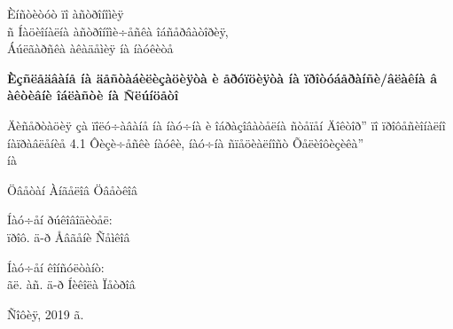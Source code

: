 \begin{titlepage}
    \begin{center}
    
    \large  Èíñòèòóò ïî àñòðîíîìèÿ \\ ñ Íàöèîíàëíà àñòðîíîìè÷åñêà îáñåðâàòîðèÿ, \\
    \large  Áúëãàðñêà àêàäåìèÿ íà íàóêèòå 
    \vspace{0.2in}
    
    
    \begin{figure}[!h]
        \begin{center}
        \end{center}
    \end{figure}
    
    {\LARGE \textbf{Èçñëåäâàíå íà äåñòàáèëèçàöèÿòà è åðóïöèÿòà íà ïðîòóáåðàíñè/âëàêíà 
            â àêòèâíè îáëàñòè íà Ñëúíöåòî}}
    \par
    \vspace{0.4in}
    Äèñåðòàöèÿ çà ïîëó÷àâàíå íà íàó÷íà è îáðàçîâàòåëíà ñòåïåí Äîêòîð''
    ïî ïðîôåñèîíàëíî íàïðàâëåíèå 4.1 Ôèçè÷åñêè íàóêè, íàó÷íà ñïåöèàëíîñò Õåëèîôèçèêà''\\
    íà
    \par
    \vspace{0.4in}
    {\large Öâåòàí Àíãåëîâ Öâåòêîâ}
    \vspace{0.5in}
    
    \par
    \vspace{0.2in}
    Íàó÷åí ðúêîâîäèòåë: \\
    ïðîô. ä-ð Åâãåíè Ñåìêîâ
    \par
    Íàó÷åí êîíñóëòàíò: \\
    ãë. àñ. ä-ð Íèêîëà Ïåòðîâ
    \par
    \vspace{0.4in}
    Ñîôèÿ, 2019 ã.
    \end{center}
    
    \end{titlepage}    